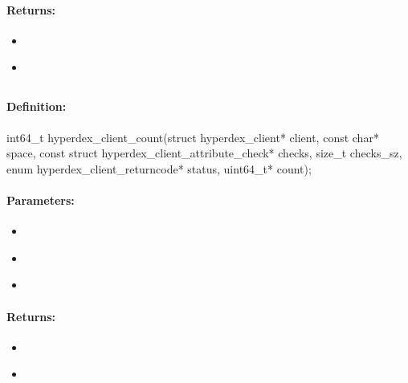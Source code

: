 \paragraph{Returns:}
\begin{itemize}[noitemsep]
\item {}\\

\item {}\\

\end{itemize}

\pagebreak
\subsection{}
\label{api:c:count}


\paragraph{Definition:}
\begin{ccode}
int64_t hyperdex_client_count(struct hyperdex_client* client,
        const char* space,
        const struct hyperdex_client_attribute_check* checks, size_t checks_sz,
        enum hyperdex_client_returncode* status,
        uint64_t* count);
\end{ccode}

\paragraph{Parameters:}
\begin{itemize}[noitemsep]
\item {}\\

\item {}\\

\item {}\\

\end{itemize}

\paragraph{Returns:}
\begin{itemize}[noitemsep]
\item {}\\

\item {}\\

\end{itemize}
